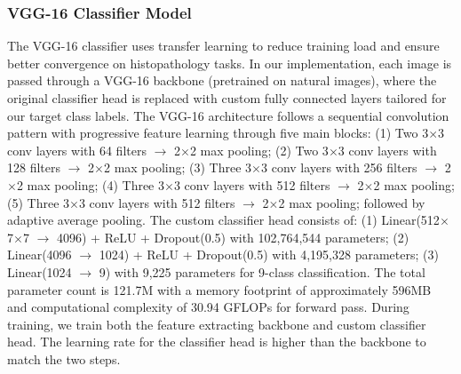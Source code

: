 \documentclass[a4paper,12pt]{article}
\begin{document}
\subsubsection{VGG-16 Classifier Model}
The VGG-16 classifier uses transfer learning to reduce training load and ensure better convergence on histopathology tasks. In our implementation, each image is passed through a VGG-16 backbone (pretrained on natural images), where the original classifier head is replaced with custom fully connected layers tailored for our target class labels. The VGG-16 architecture follows a sequential convolution pattern with progressive feature learning through five main blocks: (1) Two 3$\times$3 conv layers with 64 filters $\rightarrow$ 2$\times$2 max pooling; (2) Two 3$\times$3 conv layers with 128 filters $\rightarrow$ 2$\times$2 max pooling; (3) Three 3$\times$3 conv layers with 256 filters $\rightarrow$ 2$\times$2 max pooling; (4) Three 3$\times$3 conv layers with 512 filters $\rightarrow$ 2$\times$2 max pooling; (5) Three 3$\times$3 conv layers with 512 filters $\rightarrow$ 2$\times$2 max pooling; followed by adaptive average pooling. The custom classifier head consists of: (1) Linear(512$\times$7$\times$7 $\rightarrow$ 4096) + ReLU + Dropout(0.5) with 102,764,544 parameters; (2) Linear(4096 $\rightarrow$ 1024) + ReLU + Dropout(0.5) with 4,195,328 parameters; (3) Linear(1024 $\rightarrow$ 9) with 9,225 parameters for 9-class classification. The total parameter count is 121.7M with a memory footprint of approximately 596MB and computational complexity of 30.94 GFLOPs for forward pass. During training, we train both the feature extracting backbone and custom classifier head. The learning rate for the classifier head is higher than the backbone to match the two steps.

\end{document}
